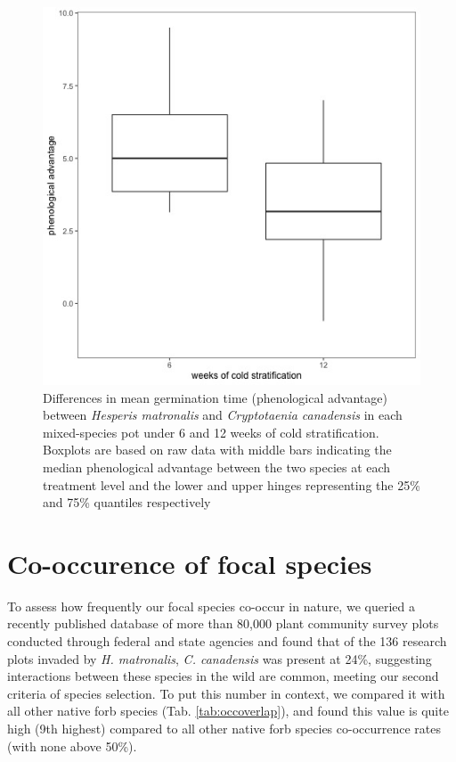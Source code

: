 \documentclass{article}[11pt]
\begin{document}
\begin{figure}[hp]
    \centering
\includegraphics[width=.7\textwidth]{..//figure/priority_treat.jpeg}
   \caption{Differences in mean germination time (phenological advantage) between \textit{Hesperis matronalis} and \textit{Cryptotaenia canadensis} in each mixed-species pot under 6 and 12 weeks of cold stratification. Boxplots are based on raw data with middle bars indicating the median phenological advantage between the two species at each treatment level and the lower and upper hinges representing the 25\% and 75\% quantiles respectively} 
   \label{fig:MGTsup}
\end{figure}

\pagebreak
\section*{Co-occurence of focal species}

To assess how frequently our focal species co-occur in nature, we queried  a recently published database of more than 80,000 plant community survey plots conducted through federal and state agencies \citep{Petri:2022tp} and found that of the 136 research plots invaded by \emph{H. matronalis}, \emph{C. canadensis} was present at 24\%, suggesting interactions between these species in the wild are common, meeting our second criteria of species selection. To put this number in context, we compared it with all other native forb species (Tab. \ref{tab:occoverlap}), and found this value is quite high (9th highest) compared to all other native forb species co-occurrence rates (with none above 50\%). %
\end{document}
